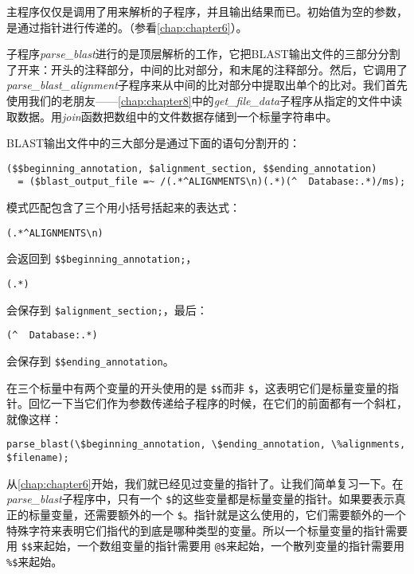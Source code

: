 

主程序仅仅是调用了用来解析的子程序，并且输出结果而已。初始值为空的参数，是通过指针进行传递的。（参看\autoref{chap:chapter6}）。

子程序\textit{parse\_blast}进行的是顶层解析的工作，它把BLAST输出文件的三部分分割了开来：开头的注释部分，中间的比对部分，和末尾的注释部分。然后，它调用了\textit{parse\_blast\_alignment}子程序来从中间的比对部分中提取出单个的比对。我们首先使用我们的老朋友——\autoref{chap:chapter8}中的\textit{get\_file\_data}子程序从指定的文件中读取数据。用\textit{join}函数把数组中的文件数据存储到一个标量字符串中。

BLAST输出文件中的三大部分是通过下面的语句分割开的：

\begin{lstlisting}
($$beginning_annotation, $alignment_section, $$ending_annotation)
  = ($blast_output_file =~ /(.*^ALIGNMENTS\n)(.*)(^  Database:.*)/ms);
\end{lstlisting}

模式匹配包含了三个用小括号括起来的表达式：

\begin{lstlisting}
(.*^ALIGNMENTS\n) 
\end{lstlisting}

会返回到 \verb|$$beginning_annotation;|，

\begin{lstlisting}
(.*) 
\end{lstlisting}

会保存到 \verb|$alignment_section;|，最后：

\begin{lstlisting}
(^  Database:.*) 
\end{lstlisting}

会保存到 \verb|$$ending_annotation|。

在三个标量中有两个变量的开头使用的是 \verb|$$|而非 \verb|$|，这表明它们是标量变量的指针。回忆一下当它们作为参数传递给子程序的时候，在它们的前面都有一个斜杠，就像这样：

\begin{lstlisting}
parse_blast(\$beginning_annotation, \$ending_annotation, \%alignments, $filename);
\end{lstlisting}

从\autoref{chap:chapter6}开始，我们就已经见过变量的指针了。让我们简单复习一下。在\textit{parse\_blast}子程序中，只有一个 \verb|$|的这些变量都是标量变量的指针。如果要表示真正的标量变量，还需要额外的一个 \verb|$|。指针就是这么使用的，它们需要额外的一个特殊字符来表明它们指代的到底是哪种类型的变量。所以一个标量变量的指针需要用 \verb|$$|来起始，一个数组变量的指针需要用 \verb|@$|来起始，一个散列变量的指针需要用 \verb|%$|来起始。

